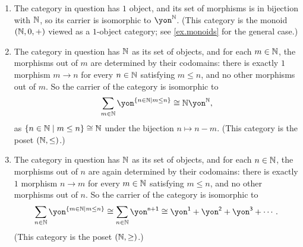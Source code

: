 \documentclass[Book-Poly]{subfiles}
\begin{document}
\begin{exercise}
\begin{solution}
\begin{enumerate}
	\item The category in question has $1$ object, and its set of morphisms is in bijection with $\mathbb{N}$, so its carrier is isomorphic to $\yon^\nn$.
	(This category is the monoid $(\mathbb{N},0,+)$ viewed as a $1$-object category; see \cref{ex.monoids} for the general case.)
	\item The category in question has $\mathbb{N}$ as its set of objects, and for each $m\in\mathbb{N}$, the morphisms out of $m$ are determined by their codomains: there is exactly $1$ morphism $m\to n$ for every $n\in\mathbb{N}$ satisfying $m\leq n$, and no other morphisms out of $m$.
	So the carrier of the category is isomorphic to
	\[
	    \sum_{m\in\nn}\yon^{\{n\in\nn\mid m\leq n\}}\iso\nn\yon^\nn,
	\]
	as $\{n\in\mathbb{N}\mid m\leq n\}\cong\mathbb{N}$ under the bijection $n\mapsto n-m$.
	(This category is the poset $(\mathbb{N},\leq)$.)
	\item The category in question has $\mathbb{N}$ as its set of objects, and for each $n\in\mathbb{N}$, the morphisms out of $n$ are again determined by their codomains: there is exactly $1$ morphism $n\to m$ for every $m\in\mathbb{N}$ satisfying $m\leq n$, and no other morphisms out of $n$.
	So the carrier of the category is isomorphic to
	\[
	    \sum_{n\in\nn}\yon^{\{m\in\nn\mid m\leq n\}}\iso\sum_{n\in\nn}\yon^{\ord{n+1}}\iso\yon^\1+\yon^\2+\yon^\3+\cdots.
	\]
    (This category is the poset $(\mathbb{N},\geq)$.)
\end{enumerate}
\end{solution}
\end{exercise}
\end{document}
